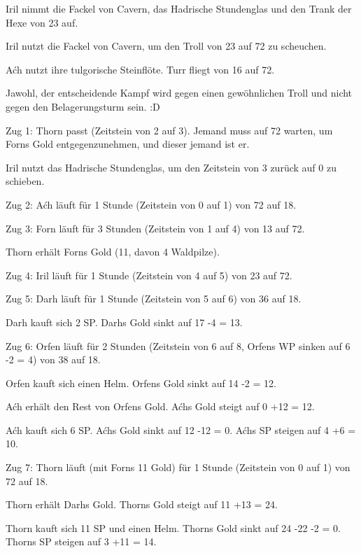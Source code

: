 \documentclass[10pt, a4paper, oneside]{book}
\begin{document}
{Iril nimmt die Fackel von Cavern, das Hadrische Stundenglas und den Trank der Hexe von 23 auf.

Iril nutzt die Fackel von Cavern, um den Troll von 23 auf 72 zu scheuchen.

Aćh nutzt ihre tulgorische Steinflöte. Turr fliegt von 16 auf 72.

Jawohl, der entscheidende Kampf wird gegen einen gewöhnlichen Troll und nicht gegen den Belagerungsturm sein. :D



Zug 1: Thorn passt (Zeitstein von 2 auf 3). Jemand muss auf 72 warten, um Forns Gold entgegenzunehmen, und dieser jemand ist er.

Iril nutzt das Hadrische Stundenglas, um den Zeitstein von 3 zurück auf 0 zu schieben.



Zug 2: Aćh läuft für 1 Stunde (Zeitstein von 0 auf 1) von 72 auf 18.



Zug 3: Forn läuft für 3 Stunden (Zeitstein von 1 auf 4) von 13 auf 72.

Thorn erhält Forns Gold (11, davon 4 Waldpilze).



Zug 4: Iril läuft für 1 Stunde (Zeitstein von 4 auf 5) von 23 auf 72.



Zug 5: Darh läuft für 1 Stunde (Zeitstein von 5 auf 6) von 36 auf 18.

Darh kauft sich 2 SP. Darhs Gold sinkt auf 17 -4 = 13.



Zug 6: Orfen läuft für 2 Stunden (Zeitstein von 6 auf 8, Orfens WP sinken auf 6 -2 = 4) von 38 auf 18.

Orfen kauft sich einen Helm. Orfens Gold sinkt auf 14 -2 = 12.

Aćh erhält den Rest von Orfens Gold. Aćhs Gold steigt auf 0 +12 = 12.

Aćh kauft sich 6 SP. Aćhs Gold sinkt auf 12 -12 = 0. Aćhs SP steigen auf 4 +6 = 10.



Zug 7: Thorn läuft (mit Forns 11 Gold) für 1 Stunde (Zeitstein von 0 auf 1) von 72 auf 18.

Thorn erhält Darhs Gold. Thorns Gold steigt auf 11 +13 = 24.

Thorn kauft sich 11 SP und einen Helm. Thorns Gold sinkt auf 24 -22 -2 = 0. Thorns SP steigen auf 3 +11 = 14.

}
\end{document}
